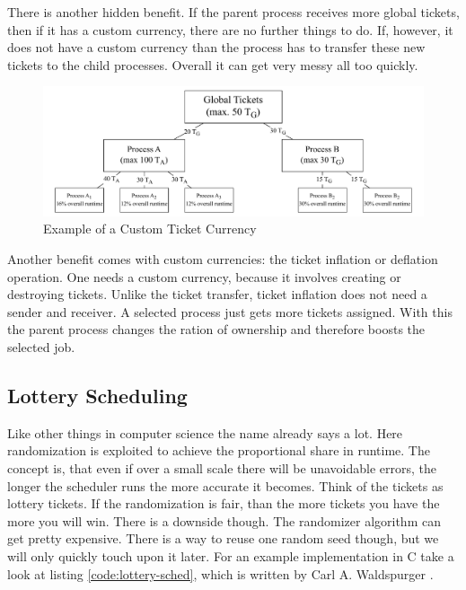 There is another hidden benefit. If the parent process receives more global tickets, then if it has a custom currency, there are no further things to do.
If, however, it does not have a custom currency than the process has to transfer these new tickets to the child processes. Overall it can get very messy all too quickly.

\begin{figure}[h]
    \centering
    \includegraphics[width=\textwidth]{Assets/Ticket-Currency.pdf}
    \caption{Example of a Custom Ticket Currency}
    \label{fig:ticket-currencies}
\end{figure}
 
Another benefit comes with custom currencies: the ticket inflation or deflation operation.
One needs a custom currency, because it involves creating or destroying tickets. 
Unlike the ticket transfer, ticket inflation does not need a sender and receiver.
A selected process just gets more tickets assigned.
With this the parent process changes the ration of ownership and therefore boosts the selected job.


\subsection{Lottery Scheduling}

Like other things in computer science the name already says a lot. 
Here randomization is exploited to achieve the proportional share in runtime.
The concept is, that even if over a small scale there will be unavoidable errors, the longer the scheduler runs the more accurate it becomes.
Think of the tickets as lottery tickets.
If the randomization is fair, than the more tickets you have the more you will win.
There is a downside though.
The randomizer algorithm can get pretty expensive.
There is a way to reuse one random seed though, but we will only quickly touch upon it later.
For an example implementation in C take a look at listing \ref{code:lottery-sched}, which is written by Carl A. Waldspurger \cite{waldspurger95}.


